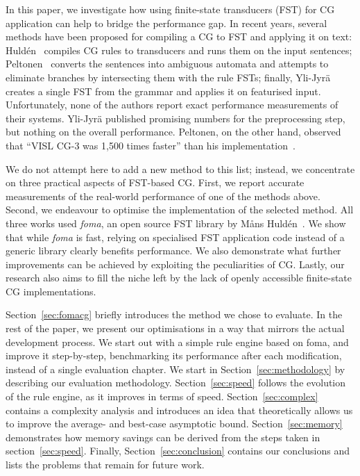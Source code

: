 \documentclass[11pt]{article}
\begin{document}
In this paper, we investigate how using finite-state transducers (FST) for CG
application can help to bridge the performance gap. In recent years, several
methods have been proposed for compiling a CG to FST and applying it on text:
Huldén~ compiles CG rules to transducers and runs them on the
input sentences; Peltonen~ converts the sentences into ambiguous
automata and attempts to eliminate branches by intersecting them with the rule
FSTs; finally, Yli-Jyrä~ creates a single FST from the
grammar and applies it on featurised input. Unfortunately, none of the authors
report exact performance measurements of their systems. Yli-Jyrä published
promising numbers for the preprocessing step, but nothing on the overall
performance. Peltonen, on the other hand, observed that ``VISL CG-3 was 1,500
times faster'' than his implementation~\cite{Peltonen:2011}.

We do not attempt here to add a new method to this list; instead, we
concentrate on three practical aspects of FST-based CG. First, we report accurate
measurements of the real-world performance of one of the methods above. Second,
we endeavour to optimise the implementation of the selected method. All three
works used \emph{foma}, an open source FST library by Måns
Huldén~. We show that while \emph{foma} is fast,
relying on specialised FST application code instead of a generic library
clearly benefits performance. We also demonstrate what further improvements can
be achieved by exploiting the peculiarities of CG. Lastly, our research also
aims to fill the niche left by the lack of openly accessible finite-state CG
implementations.

Section~\ref{sec:fomacg} briefly introduces the method we chose to evaluate.
In the rest of the paper, we present our optimisations in a way that mirrors the
actual development process. We start out with a simple rule engine based on
foma, and improve it step-by-step, benchmarking its performance after each
modification, instead of a single evaluation chapter. We start in
Section~\ref{sec:methodology} by describing our evaluation methodology.
Section~\ref{sec:speed} follows the evolution of the rule engine, as it improves
in terms of speed. Section~\ref{sec:complex} contains a complexity analysis
and introduces an idea that theoretically allows us to improve the average- and
best-case asymptotic bound.
Section~\ref{sec:memory} demonstrates how memory savings can be derived from the
steps taken in section~\ref{sec:speed}. Finally, Section~\ref{sec:conclusion}
contains our conclusions and lists the problems that remain for future work.
\end{document}
